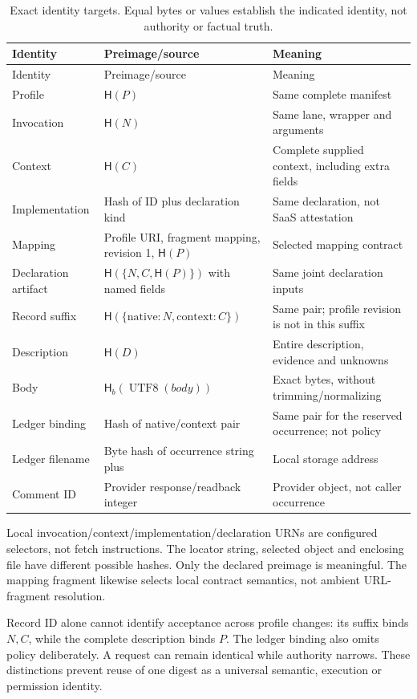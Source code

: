 \documentclass[11pt,letterpaper]{article}
\newcommand{\code}[1]{\texttt{\detokenize{#1}}}
\newcommand{\Hash}{\mathsf{H}}
\newcommand{\ByteHash}{\mathsf{H}_{b}}
\begin{document}
\begin{longtable}{@{}L{.25\linewidth}L{.34\linewidth}L{.34\linewidth}@{}}
\caption{Exact identity targets. Equal bytes or values establish the indicated
identity, not authority or factual truth.}\label{tab:identities}\\
\toprule Identity & Preimage/source & Meaning \\ \midrule
\endfirsthead
\toprule Identity & Preimage/source & Meaning \\ \midrule
\endhead
Profile & $\Hash(P)$ & Same complete manifest \\
Invocation & $\Hash(N)$ & Same lane, wrapper and arguments \\
Context & $\Hash(C)$ & Complete supplied context, including extra fields \\
Implementation & Hash of ID plus declaration kind & Same declaration, not SaaS attestation \\
Mapping & Profile URI, fragment mapping, revision 1, $\Hash(P)$ & Selected mapping contract \\
Declaration artifact & $\Hash(\{N,C,\Hash(P)\})$ with named fields & Same joint declaration inputs \\
Record suffix & $\Hash(\{\mathrm{native}:N,\mathrm{context}:C\})$ & Same pair; profile revision is not in this suffix \\
Description & $\Hash(D)$ & Entire description, evidence and unknowns \\
Body & $\ByteHash(\operatorname{UTF8}(body))$ & Exact bytes, without trimming/normalizing \\
Ledger binding & Hash of native/context pair & Same pair for the reserved occurrence; not policy \\
Ledger filename & Byte hash of occurrence string plus \code{.json} & Local storage address \\
Comment ID & Provider response/readback integer & Provider object, not caller occurrence \\
\bottomrule
\end{longtable}

Local invocation/context/implementation/declaration URNs are configured selectors,
not fetch instructions. The locator string, selected object and enclosing file
have different possible hashes. Only the declared preimage is meaningful.
The mapping fragment likewise selects local contract semantics, not ambient
URL-fragment resolution.

Record ID alone cannot identify acceptance across profile changes: its suffix
binds $N,C$, while the complete description binds $P$. The ledger binding also
omits policy deliberately. A request can remain identical while authority
narrows. These distinctions prevent reuse of one digest as a universal semantic,
execution or permission identity.
\end{document}
